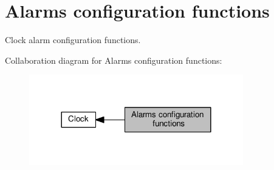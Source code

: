 \hypertarget{group___clock___alarms}{}\section{Alarms configuration functions}
\label{group___clock___alarms}


Clock alarm configuration functions.  


Collaboration diagram for Alarms configuration functions\+:\nopagebreak
\begin{figure}[H]
\begin{center}
\leavevmode
\includegraphics[width=264pt]{d9/dcf/group___clock___alarms}
\end{center}
\end{figure}
